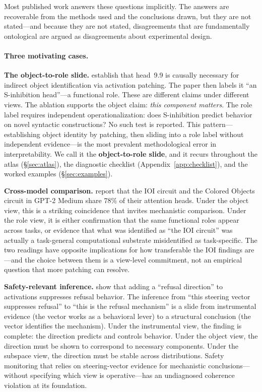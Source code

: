 \documentclass{article}
\begin{document}
Most published work answers these questions implicitly.  The answers are
recoverable from the methods used and the conclusions drawn, but they are
not stated---and because they are not stated, disagreements that are
fundamentally ontological are argued as disagreements about experimental
design.

\paragraph{Three motivating cases.}

\textbf{The object-to-role slide.}
\citet{wang2022} establish that head~9.9 is causally necessary for
indirect object identification via activation patching.  The paper then
labels it ``an S-inhibition head''---a functional role.  These are
different claims under different views.  The ablation supports the
object claim: \emph{this component matters}.  The role label requires
independent operationalization: does S-inhibition predict behavior on
novel syntactic constructions?  No such test is reported.  This
pattern---establishing object identity by patching, then sliding into a
role label without independent evidence---is the most prevalent
methodological error in interpretability.
We call it the \textbf{object-to-role slide}, and it recurs throughout
the atlas (\S\ref{sec:atlas}), the diagnostic checklist
(Appendix~\ref{app:checklist}), and the worked examples
(\S\ref{sec:examples}).

\textbf{Cross-model comparison.}
\citet{merullo2024} report that the IOI circuit and the Colored Objects
circuit in GPT-2 Medium share 78\% of their attention heads.  Under the
object view, this is a striking coincidence that invites mechanistic
comparison.  Under the role view, it is either confirmation that the
same functional roles appear across tasks, or evidence that what was
identified as ``the IOI circuit'' was actually a task-general
computational substrate misidentified as task-specific.  The two
readings have opposite implications for how transferable the IOI
findings are---and the choice between them is a view-level commitment,
not an empirical question that more patching can resolve.

\textbf{Safety-relevant inference.}
\citet{arditi2024} show that adding a ``refusal direction'' to
activations suppresses refusal behavior.  The inference from ``this
steering vector suppresses refusal'' to ``this is the refusal
mechanism'' is a slide from instrumental evidence (the vector works as
a behavioral lever) to a structural conclusion (the vector identifies
the mechanism).  Under the instrumental view, the finding is complete:
the direction predicts and controls behavior.  Under the object view,
the direction must be shown to correspond to necessary components.
Under the subspace view, the direction must be stable across
distributions.  Safety monitoring that relies on steering-vector
evidence for mechanistic conclusions---without specifying which view
is operative---has an undiagnosed coherence violation at its
foundation.
\end{document}

